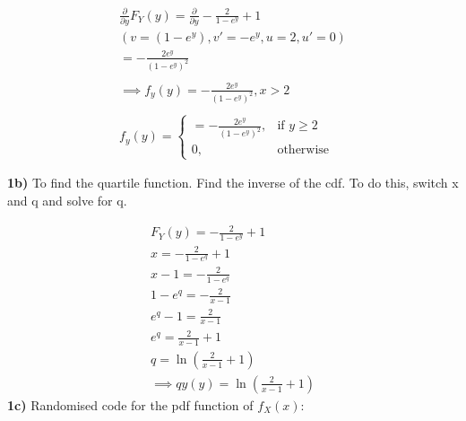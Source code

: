 \documentclass[oneside, a4paper]{article}
\begin{document}
\begin{equation}
    \begin{split}
    \frac{\partial }{\partial y} F_Y(y) = \frac{\partial }{\partial y}-\frac{2}{1 - e^y} + 1 \\
    \left(v = (1 - e^y), v' = -e^y, u = 2, u' = 0  \right)\\
    = -\frac{2e^y}{\left(1 -e^y \right)^2} \\\\
    \implies f_y(y) = -\frac{2e^y}{\left(1 -e^y \right)^2}, x > 2 \\\\
        f_y(y)= 
    \begin{cases}
        = -\frac{2e^y}{\left(1 -e^y \right)^2},& \text{if } y\geq 2\\
        0,              & \text{otherwise}
    \end{cases}
    \end{split}
\end{equation}

\textbf{1b)} To find the quartile function. Find the inverse of the cdf. To do this, switch x and q and solve for q.

\begin{equation}
    \begin{split}
    F_Y(y) = -\frac{2}{1 - e^y} + 1 \\
    x = -\frac{2}{1 - e^q} + 1 \\
    x - 1 = -\frac{2}{1 - e^q} \\ 
    1 - e^q = -\frac{2}{x - 1} \\ 
    e^q - 1 = \frac{2}{x - 1} \\ 
    e^q = \frac{2}{x - 1} + 1 \\ 
    q = \ln{\left(\frac{2}{x - 1} + 1\right)} \\ 
    \implies qy(y) = \ln{\left(\frac{2}{x - 1} + 1\right)}
    \end{split}
\end{equation} 
\textbf{1c)} Randomised code for the pdf function of $f_X(x)$:
\end{document}
